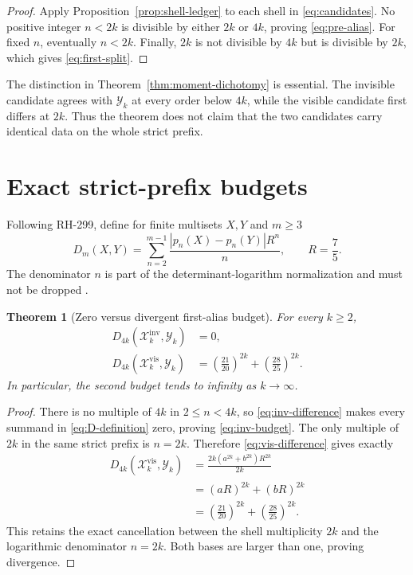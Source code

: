 \documentclass[11pt]{article}
\newtheorem{theorem}{Theorem}[section]
\theoremstyle{remark}
\newcommand{\cY}{\mathcal Y}
\newcommand{\cX}{\mathcal X}
\newcommand{\inv}{\mathrm{inv}}
\newcommand{\vis}{\mathrm{vis}}
\begin{document}
\begin{proof}
Apply Proposition~\ref{prop:shell-ledger} to each shell in
\eqref{eq:candidates}.  No positive integer $n<2k$ is divisible by either
$2k$ or $4k$, proving \eqref{eq:pre-alias}.  For fixed $n$, eventually
$n<2k$.  Finally, $2k$ is not divisible by $4k$ but is divisible by $2k$,
which gives \eqref{eq:first-split}.
\end{proof}

The distinction in Theorem~\ref{thm:moment-dichotomy} is essential.  The
invisible candidate agrees with $\cY_k$ at every order below $4k$, while the
visible candidate first differs at $2k$.  Thus the theorem does not claim
that the two candidates carry identical data on the whole strict prefix.

\section{Exact strict-prefix budgets}

Following RH-299, define for finite multisets $X,Y$ and $m\ge3$
\begin{equation}\label{eq:D-definition}
 D_m(X,Y)=\sum_{n=2}^{m-1}
 \frac{|p_n(X)-p_n(Y)|R^n}{n},
 \qquad R=\frac75.
\end{equation}
The denominator $n$ is part of the determinant-logarithm normalization and
must not be dropped \citep{WangRootTransport2026}.

\begin{theorem}[Zero versus divergent first-alias budget]
\label{thm:budget-dichotomy}
For every $k\ge2$,
\begin{align}
 D_{4k}(\cX_k^{\inv},\cY_k)&=0,
 \label{eq:inv-budget}\\
 D_{4k}(\cX_k^{\vis},\cY_k)
 &=\left(\frac{21}{20}\right)^{2k}
  +\left(\frac{28}{25}\right)^{2k}.
 \label{eq:vis-budget}
\end{align}
In particular, the second budget tends to infinity as $k\to\infty$.
\end{theorem}

\begin{proof}
There is no multiple of $4k$ in $2\le n<4k$, so
\eqref{eq:inv-difference} makes every summand in \eqref{eq:D-definition}
zero, proving \eqref{eq:inv-budget}.  The only multiple of $2k$ in the same
strict prefix is $n=2k$.  Therefore \eqref{eq:vis-difference} gives exactly
\begin{align*}
 D_{4k}(\cX_k^{\vis},\cY_k)
 &=\frac{2k(a^{2k}+b^{2k})R^{2k}}{2k}\\
 &=(aR)^{2k}+(bR)^{2k}\\
 &=\left(\frac{21}{20}\right)^{2k}
  +\left(\frac{28}{25}\right)^{2k}.
\end{align*}
This retains the exact cancellation between the shell multiplicity $2k$ and
the logarithmic denominator $n=2k$.  Both bases are larger than one, proving
divergence.
\end{proof}
\end{document}
